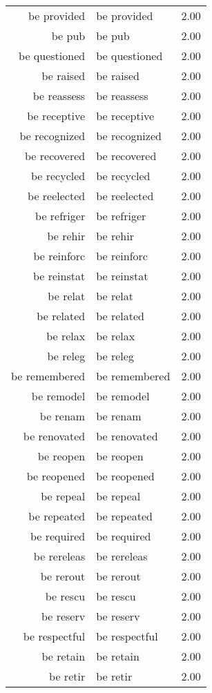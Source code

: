 \begin{table}[ht]
\begin{tabular}{rlr}
  be provided & be provided & 2.00 \\ 
  be pub & be pub & 2.00 \\ 
  be questioned & be questioned & 2.00 \\ 
  be raised & be raised & 2.00 \\ 
  be reassess & be reassess & 2.00 \\ 
  be receptive & be receptive & 2.00 \\ 
  be recognized & be recognized & 2.00 \\ 
  be recovered & be recovered & 2.00 \\ 
  be recycled & be recycled & 2.00 \\ 
  be reelected & be reelected & 2.00 \\ 
  be refriger & be refriger & 2.00 \\ 
  be rehir & be rehir & 2.00 \\ 
  be reinforc & be reinforc & 2.00 \\ 
  be reinstat & be reinstat & 2.00 \\ 
  be relat & be relat & 2.00 \\ 
  be related & be related & 2.00 \\ 
  be relax & be relax & 2.00 \\ 
  be releg & be releg & 2.00 \\ 
  be remembered & be remembered & 2.00 \\ 
  be remodel & be remodel & 2.00 \\ 
  be renam & be renam & 2.00 \\ 
  be renovated & be renovated & 2.00 \\ 
  be reopen & be reopen & 2.00 \\ 
  be reopened & be reopened & 2.00 \\ 
  be repeal & be repeal & 2.00 \\ 
  be repeated & be repeated & 2.00 \\ 
  be required & be required & 2.00 \\ 
  be rereleas & be rereleas & 2.00 \\ 
  be rerout & be rerout & 2.00 \\ 
  be rescu & be rescu & 2.00 \\ 
  be reserv & be reserv & 2.00 \\ 
  be respectful & be respectful & 2.00 \\ 
  be retain & be retain & 2.00 \\ 
  be retir & be retir & 2.00 \\ 

\end{tabular}
\end{table}
